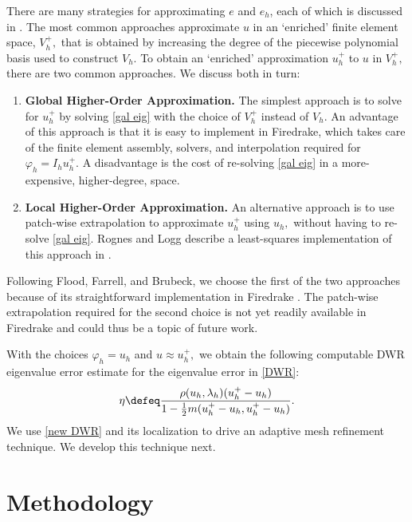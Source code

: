 There are many strategies for approximating $e$ and $e_h$, each of which is discussed in \cite{Bangerth, Heuveline}. The most common approaches approximate $u$ in an `enriched' finite element space, $V_h^+,$  that is obtained by increasing the degree of the piecewise polynomial basis used to construct $V_h.$ To obtain an `enriched' approximation $u_h^+$ to $u$ in $V_h^+,$ there are two common approaches. We discuss both in turn:
\begin{enumerate}
    \item \textbf{Global Higher-Order Approximation.}
    The simplest approach is to solve for $u_h^+$ by solving \eqref{gal eig} with the choice of $V_h^+$ instead of $V_h.$ An advantage of this approach is that it is easy to implement in Firedrake, which takes care of the finite element assembly, solvers, and interpolation required for $\varphi_h = I_h u_h^+.$ A disadvantage is the cost of re-solving \eqref{gal eig} in a more-expensive, higher-degree, space. 
    \item \textbf{Local Higher-Order Approximation.}
    An alternative approach is to use patch-wise extrapolation to approximate $u_h^+$ using $u_h,$ without having to re-solve \eqref{gal eig}. Rognes and Logg describe a least-squares implementation of this approach in \cite{logg}. 
\end{enumerate}
Following Flood, Farrell, and Brubeck, we choose the first of the two approaches because of its straightforward implementation in Firedrake \cite{joe, pablo}. The patch-wise extrapolation required for the second choice is not yet readily available in Firedrake and could thus be a topic of future work. 

With the choices $\varphi_h = u_h$ and $u \approx u_h^+,$ we obtain the following computable DWR eigenvalue error estimate for the eigenvalue error in \eqref{DWR}:
\begin{equation} \label{new DWR}
  \eta \defeq \frac{\rho(u_h, \lambda_h)(u_h^+ - u_h)}{1 - \frac{1}{2} m(u_h^+ - u_h, u_h^+ - u_h)}.
\end{equation}
We use \eqref{new DWR} and its localization to drive an adaptive mesh refinement technique. We develop this technique next. 










\chapter{Methodology}

